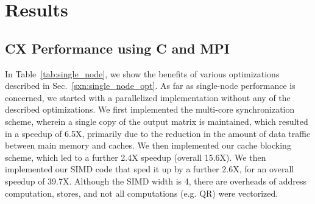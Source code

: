 \section{Results}
\label{sec:results}



\subsection{CX Performance using C and MPI} %
  \label{sxn:results1}


   

      In Table~\ref{tab:single_node}, we show the benefits of various
      optimizations described in
      Sec.~\ref{sxn:single_node_opt}. 
      As far as single-node performance is concerned, we started with a parallelized implementation  
      without any of the described optimizations. %
      We first implemented the multi-core synchronization scheme, wherein a single copy of the
      output matrix is maintained, %
      which resulted in a speedup of 6.5X, primarily due to
      the reduction in the amount of data traffic between 
      main memory and caches. 
      We then implemented our cache blocking scheme, which led to a
      further  2.4X speedup (overall 15.6X).
      We then implemented our SIMD code that sped it up by a further
      2.6X, for an overall speedup of 39.7X. Although the 
      SIMD width is 4, 
        there are overheads of address
        computation, stores, and not all computations (e.g. QR) were
        vectorized.



